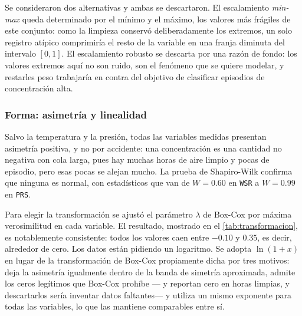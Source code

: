Se consideraron dos alternativas y ambas se descartaron. El escalamiento
\textit{min-max} queda determinado por el mínimo y el máximo, los valores más
frágiles de este conjunto: como la limpieza conservó deliberadamente los
extremos, un solo registro atípico comprimiría el resto de la variable en una
franja diminuta del intervalo $[0,1]$. El escalamiento robusto se descarta por
una razón de fondo: los valores extremos aquí no son ruido, son el fenómeno que
se quiere modelar, y restarles peso trabajaría en contra del objetivo de
clasificar episodios de concentración alta.

\subsubsection*{Forma: asimetría y linealidad}

Salvo la temperatura y la presión, todas las variables medidas presentan
asimetría positiva, y no por accidente: una concentración es una cantidad no
negativa con cola larga, pues hay muchas horas de aire limpio y pocas de
episodio, pero esas pocas se alejan mucho. La prueba de Shapiro-Wilk confirma que
ninguna es normal, con estadísticos que van de $W=0.60$ en \texttt{WSR} a
$W=0.99$ en \texttt{PRS}.

Para elegir la transformación se ajustó el parámetro $\lambda$ de Box-Cox por
máxima verosimilitud en cada variable. El resultado, mostrado en el
\cref{tab:transformacion}, es notablemente consistente: todos los valores caen
entre $-0.10$ y $0.35$, es decir, alrededor de cero. Los datos están pidiendo un
logaritmo. Se adopta $\ln(1+x)$ en lugar de la transformación de Box-Cox
propiamente dicha por tres motivos: deja la asimetría igualmente dentro de la
banda de simetría aproximada, admite los ceros legítimos que Box-Cox prohíbe
--- y  reportan cero en horas limpias, y descartarlos sería
inventar datos faltantes--- y utiliza un mismo exponente para todas las
variables, lo que las mantiene comparables entre sí.

